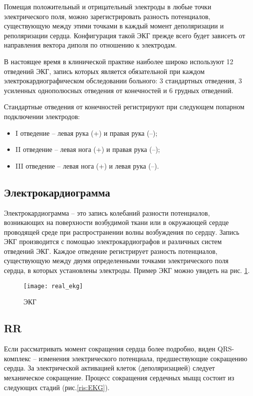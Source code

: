 Помещая положительный и отрицательный электроды в любые точки электрического поля, можно зарегистрировать разность потенциалов, существующую между этими точками в каждый момент деполяризации и реполяризации сердца. Конфигурация такой ЭКГ прежде всего будет зависеть от направления вектора диполя по отношению к электродам.

В настоящее время в клинической практике наиболее широко используют 12 отведений ЭКГ, запись которых является обязательной при каждом электрокардиографическом обследовании больного: 3 стандартных отведения, 3 усиленных однополюсных отведения от конечностей и 6 грудных отведений.

Стандартные отведения от конечностей регистрируют при следующем попарном подключении электродов:

\begin{itemize}
	\item I отведение – левая рука (+) и правая рука (–);
	\item II отведение – левая нога (+) и правая рука (–);
	\item III отведение – левая нога (+) и левая рука (–).
\end{itemize}

\subsection{Электрокардиограмма}

Электрокардиограмма – это запись колебаний разности потенциалов, возникающих на поверхности возбудимой ткани или в окружающей сердце проводящей среде при распространении волны возбуждения по сердцу.\cite{ekg1} Запись ЭКГ производится с помощью электрокардиографов и различных систем отведений ЭКГ. Каждое отведение регистрирует разность потенциалов, существующую между двумя определенными точками электрического поля сердца, в которых установлены электроды. Пример ЭКГ можно увидеть на рис. \ref{ris:RR}.

\begin{figure}[h!]
	\begin{center}
		\texttt{[image: real\_ekg]}
		\caption{ЭКГ}
		\label{ris:RR}
	\end{center}
\end{figure}

\subsection{RR}

Если рассматривать момент сокращения сердца более подробно, виден QRS-комплекс -- изменения электрического потенциала, предшествующие сокращению сердца. За электрической активацией клеток (деполяризацией) следует механическое сокращение. Процесс сокращения сердечных мыщц состоит из следующих стадий (рис.\ref{ris:EKG}).

